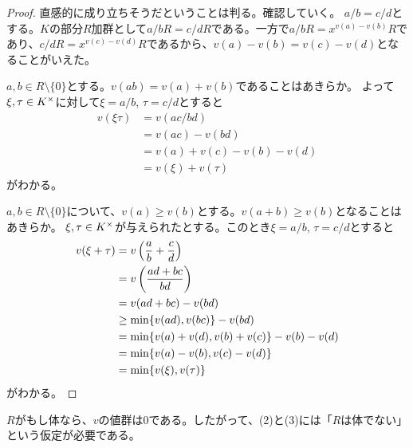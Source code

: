 
\begin{proof}
  直感的に成り立ちそうだということは判る。確認していく。
  $a/b=c/d$とする。$K$の部分$R$加群として$a/b R = c/d R$である。一方で$a/b R = x^{v(a)-v(b)}R$であり、$c/d R = x^{v(c)-v(d)}R$であるから、$v(a) - v(b) = v(c) - v(d)$となることがいえた。

$a,b \in R \setminus \{0\}$とする。$v(ab)=v(a) + v(b)$であることはあきらか。
よって$\xi , \tau \in K^{\times}$に対して$\xi = a/b$, $\tau = c/d$とすると
    \begin{align*}
      v(\xi \tau ) &= v(ac/bd) \\
      &= v(ac) - v(bd) \\
      &= v(a) + v(c) - v(b) - v(d) \\
      &= v(\xi) + v(\tau)
    \end{align*}
    がわかる。

 $a,b \in  R \setminus \{0\}$について、$v(a) \geq v(b)$とする。$v(a+b) \geq v(b)$となることはあきらか。
    $\xi , \tau \in K^{\times}$が与えられたとする。このとき$\xi = a/b$, $\tau = c/d$とすると
    \begin{align*}
      v(\xi + \tau ) &= v\left( \frac{a}{b} + \frac{c}{d} \right) \\
      &= v \left( \frac{ad+bc}{bd} \right) \\
      &= v(ad+bc) - v(bd) \\
      &\geq \min\{v(ad), v(bc) \} - v(bd) \\
      &= \min\{v(a)+v(d),v(b ) + v(c) \} - v(b)-v(d) \\
      &= \min\{v(a)-v(b),v(c)-v(d) \} \\
      &= \min \{ v(\xi), v(\tau)\}
    \end{align*}
    がわかる。
\end{proof}


\begin{rem}
  $R$がもし体なら、$v$の値群は$0$である。したがって、(2)と(3)には「$R$は体でない」という仮定が必要である。
\end{rem}


